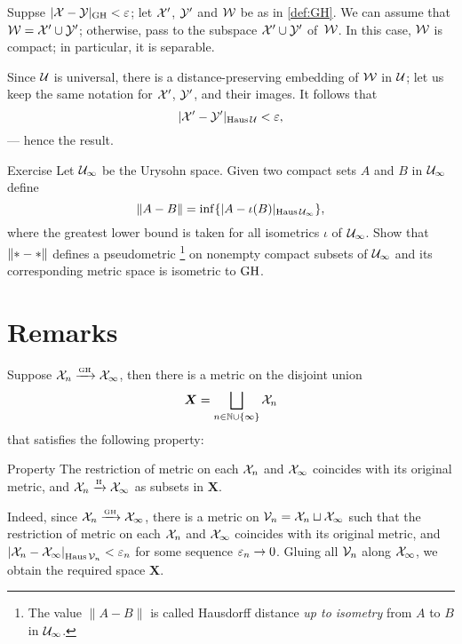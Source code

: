 Suppse $|\mathcal{X}-\mathcal{Y}|_{\operatorname{\rm GH}\nolimits}<\varepsilon$;
let $\mathcal{X}'$, $\mathcal{Y}'$ and $\mathcal{W}$ be as in \ref{def:GH}.
We can assume that $\mathcal{W}=\mathcal{X}'\cup\mathcal{Y}'$;
otherwise, pass to the subspace $\mathcal{X}'\cup\mathcal{Y}'$ of~$\mathcal{W}$.
In this case, $\mathcal{W}$ is compact;
in particular, it is separable.

Since $\mathcal{U}$ is universal, there is a distance-preserving embedding of $\mathcal{W}$ in $\mathcal{U}$;
let us keep the same notation for $\mathcal{X}'$, $\mathcal{Y}'$, and their images.
It follows that 
\[|\mathcal{X}'-\mathcal{Y}'|_{\operatorname{\rm Haus}\nolimits\mathcal{U}}<\varepsilon,\]
--- hence the result.
\qeds

\begin{thm}{Exercise}\label{ex:GH-urysohn}
Let $\mathcal{U}_\infty$ be the Urysohn space.
Given two compact sets $A$ and $B$ in $\mathcal{U}_\infty$ define 
\[\|A-B\|=\inf\{|A-\iota(B)|_{\operatorname{\rm Haus}\nolimits\mathcal{U}_\infty}\},\]
where the greatest lower bound is taken for all isometrics $\iota$ of $\mathcal{U}_\infty$.
Show that $\|{*}\z-{*}\|$ defines a pseudometric%
\footnote{The value $\|A-B\|$ is called Hausdorff distance \emph{up to isometry} from $A$ to $B$ in $\mathcal{U}_\infty$.}
on nonempty compact subsets of $\mathcal{U}_\infty$ and its corresponding metric space is isometric to $\operatorname{\rm GH}\nolimits$.
\end{thm}

\section{Remarks}

Suppose $\mathcal{X}_n\xrightarrow{\mbox{\tiny\rm GH}} \mathcal{X}_\infty$, then there is a metric on the disjoint union 
\[\bm{X}=\bigsqcup_{n\in \mathbb{N}\cup\{\infty\}} \mathcal{X}_n\] 
that satisfies the following property:

\begin{thm}{Property}\label{propery:GH}
The restriction of metric on each $\mathcal{X}_n$ and $\mathcal{X}_\infty$ coincides with its original metric, 
and $\mathcal{X}_n\xrightarrow{\mbox{\tiny\rm H}} \mathcal{X}_\infty$ as subsets in $\bm{X}$.
\end{thm}

Indeed, since $\mathcal{X}_n\xrightarrow{\mbox{\tiny\rm GH}} \mathcal{X}_\infty$, there is a metric on $\mathcal{V}_n=\mathcal{X}_n\sqcup \mathcal{X}_\infty$ such that the restriction of metric on each $\mathcal{X}_n$ and $\mathcal{X}_\infty$ coincides with its original metric, and $\dist{\spc{X}_n}{\spc{X}_\infty}{\Haus\spc{V}_n}<\eps_n$ for some sequence $\varepsilon_n\to 0$.
Gluing all $\mathcal{V}_n$ along $\mathcal{X}_\infty$, we obtain the required space $\bm{X}$.

